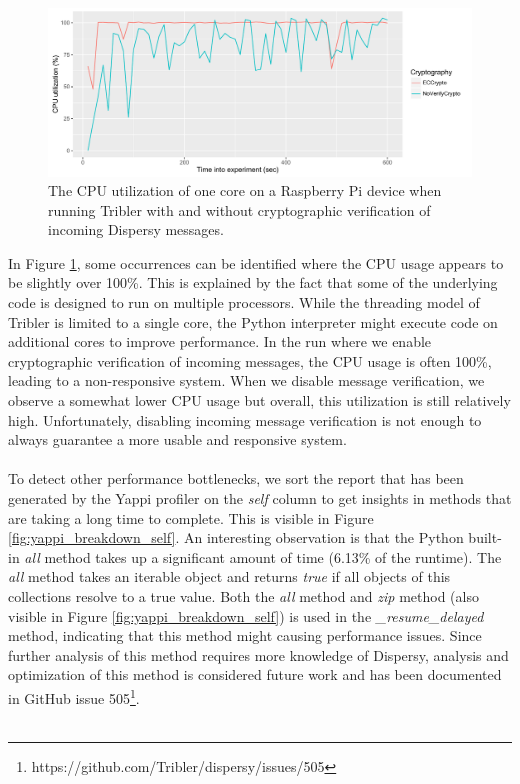 \begin{figure}[!h]
	\centering
	\includegraphics[width=1.0\columnwidth]{images/experiments/raspi_cpu_usage}
	\caption{The CPU utilization of one core on a Raspberry Pi device when running Tribler with and without cryptographic verification of incoming Dispersy messages.}
	\label{fig:raspi_cpu_usage}
\end{figure}

In Figure \ref{fig:raspi_cpu_usage}, some occurrences can be identified where the CPU usage appears to be slightly over 100\%. This is explained by the fact that some of the underlying code is designed to run on multiple processors. While the threading model of Tribler is limited to a single core, the Python interpreter might execute code on additional cores to improve performance. In the run where we enable cryptographic verification of incoming messages, the CPU usage is often 100\%, leading to a non-responsive system. When we disable message verification, we observe a somewhat lower CPU usage but overall, this utilization is still relatively high. Unfortunately, disabling incoming message verification is not enough to always guarantee a more usable and responsive system.\\\\
To detect other performance bottlenecks, we sort the report that has been generated by the Yappi profiler on the \emph{self} column to get insights in methods that are taking a long time to complete. This is visible in Figure \ref{fig:yappi_breakdown_self}. An interesting observation is that the Python built-in \emph{all} method takes up a significant amount of time (6.13\% of the runtime). The \emph{all} method takes an iterable object and returns \emph{true} if all objects of this collections resolve to a true value. Both the \emph{all} method and \emph{zip} method (also visible in Figure \ref{fig:yappi_breakdown_self}) is used in the \emph{\_resume\_delayed} method, indicating that this method might causing performance issues. Since further analysis of this method requires more knowledge of Dispersy, analysis and optimization of this method is considered future work and has been documented in GitHub issue 505\footnote{https://github.com/Tribler/dispersy/issues/505}.\\\\

